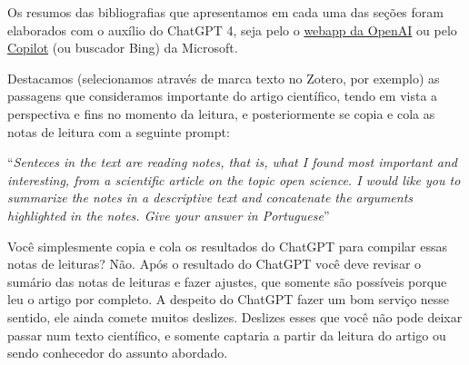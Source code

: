 \documentclass[
  a4paper,
]{book}
\newcounter{quartocallouttipno}
\newcommand{\quartocallouttip}[1]{\refstepcounter{quartocallouttipno}\label{#1}}
\begin{document}
\begin{tcolorbox}[enhanced jigsaw, opacitybacktitle=0.6, titlerule=0mm, left=2mm, toptitle=1mm, opacityback=0, arc=.35mm, colback=white, rightrule=.15mm, breakable, leftrule=.75mm, bottomrule=.15mm, colbacktitle=quarto-callout-important-color!10!white, colframe=quarto-callout-important-color-frame, coltitle=black, bottomtitle=1mm, toprule=.15mm, title=\textcolor{quarto-callout-important-color}{\faExclamation}\hspace{0.5em}{Tip \ref*{tip-prompt}: ChatGPT para suas notas de leituras}]

\quartocallouttip{tip-prompt} 

Os resumos das bibliografias que apresentamos em cada uma das seções
foram elaborados com o auxílio do ChatGPT 4, seja pelo o
\href{https://chat.openai.com/}{webapp da OpenAI} ou pelo
\href{https://copilot.microsoft.com/}{Copilot} (ou buscador Bing) da
Microsoft.\vspace{0.5em}

Destacamos (selecionamos através de marca texto no Zotero, por exemplo)
as passagens que consideramos importante do artigo científico, tendo em
vista a perspectiva e fins no momento da leitura, e posteriormente se
copia e cola as notas de leitura com a seguinte prompt:\vspace{0.5em}

``\emph{Senteces in the text are reading notes, that is, what I found
most important and interesting, from a scientific article on the topic
open science. I would like you to summarize the notes in a descriptive
text and concatenate the arguments highlighted in the notes. Give your
answer in Portuguese}''

\end{tcolorbox}

\begin{tcolorbox}[enhanced jigsaw, opacitybacktitle=0.6, titlerule=0mm, left=2mm, toptitle=1mm, opacityback=0, arc=.35mm, colback=white, rightrule=.15mm, breakable, leftrule=.75mm, bottomrule=.15mm, colbacktitle=quarto-callout-caution-color!10!white, colframe=quarto-callout-caution-color-frame, coltitle=black, bottomtitle=1mm, toprule=.15mm, title=\textcolor{quarto-callout-caution-color}{\faFire}\hspace{0.5em}{Não confie cegamente na IA}]

Você simplesmente copia e cola os resultados do ChatGPT para compilar
essas notas de leituras? Não. Após o resultado do ChatGPT você deve
revisar o sumário das notas de leituras e fazer ajustes, que somente são
possíveis porque leu o artigo por completo. A despeito do ChatGPT fazer
um bom serviço nesse sentido, ele ainda comete muitos deslizes. Deslizes
esses que você não pode deixar passar num texto científico, e somente
captaria a partir da leitura do artigo ou sendo conhecedor do assunto
abordado.

\end{tcolorbox}
\end{document}
